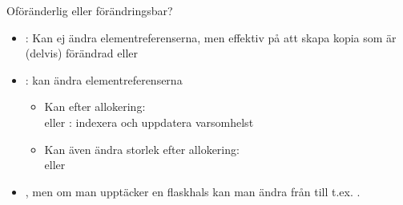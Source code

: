 \begin{Slide}{Oföränderlig eller förändringsbar?}
\begin{itemize}
\item {}:  Kan ej ändra elementreferenserna, men effektiv på att skapa kopia som är (delvis) förändrad  eller 

\item {}: kan ändra elementreferenserna
  \begin{itemize}
  \item Kan  efter allokering: \\  eller : indexera och uppdatera varsomhelst
  \item Kan även ändra storlek efter allokering:
  \\ eller 
  \end{itemize}
\item {}, men om man  upptäcker en flaskhals kan man ändra från  till t.ex. .
\end{itemize}
\end{Slide}






